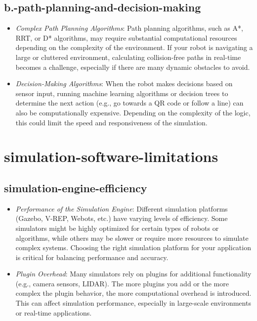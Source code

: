 \documentclass[../../main]{subfiles}
\begin{document}
    \subsection{b.-path-planning-and-decision-making}
    \begin{itemize}
    \item
      \emph{Complex Path Planning Algorithms}: Path planning algorithms,
      such as A*, RRT, or D* algorithms, may require substantial
      computational resources depending on the complexity of the
      environment. If your robot is navigating a large or cluttered
      environment, calculating collision-free paths in real-time becomes a
      challenge, especially if there are many dynamic obstacles to avoid.
    \item
      \emph{Decision-Making Algorithms}: When the robot makes decisions
      based on sensor input, running machine learning algorithms or decision
      trees to determine the next action (e.g., go towards a QR code or
      follow a line) can also be computationally expensive. Depending on the
      complexity of the logic, this could limit the speed and responsiveness
      of the simulation.
    \end{itemize}
    
    \section{simulation-software-limitations}
    
    \subsection{simulation-engine-efficiency}
    \begin{itemize}
    \item
      \emph{Performance of the Simulation Engine}: Different simulation
      platforms (Gazebo, V-REP, Webots, etc.) have varying levels of
      efficiency. Some simulators might be highly optimized for certain
      types of robots or algorithms, while others may be slower or require
      more resources to simulate complex systems. Choosing the right
      simulation platform for your application is critical for balancing
      performance and accuracy.
    \item
      \emph{Plugin Overhead}: Many simulators rely on plugins for
      additional functionality (e.g., camera sensors, LIDAR). The more
      plugins you add or the more complex the plugin behavior, the more
      computational overhead is introduced. This can affect simulation
      performance, especially in large-scale environments or real-time
      applications.
    \end{itemize}
    
\end{document}

